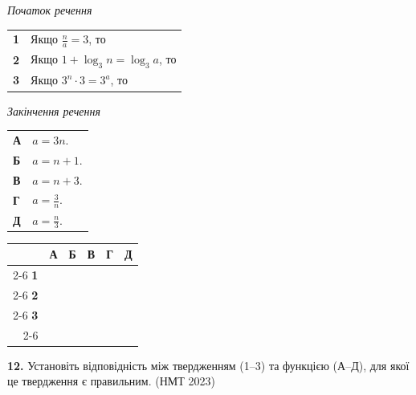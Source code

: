 \documentclass[14pt]{extarticle}
\newcommand{\answerGrid}{
    \begingroup
    \setlength{\tabcolsep}{4pt}
    \renewcommand{\arraystretch}{1.2}
    \small
    \begin{tabular}{r|c|c|c|c|c|}
         \multicolumn{1}{c}{} & \multicolumn{1}{c}{\textbf{А}} & \multicolumn{1}{c}{\textbf{Б}} & \multicolumn{1}{c}{\textbf{В}} & \multicolumn{1}{c}{\textbf{Г}} & \multicolumn{1}{c}{\textbf{Д}} \\ \cline{2-6}
         \textbf{1} & & & & & \\ \cline{2-6}
         \textbf{2} & & & & & \\ \cline{2-6}
         \textbf{3} & & & & & \\ \cline{2-6}
    \end{tabular}
    \endgroup
}
\newcommand{\nmtyear}[1]{\hfill{\small\color{yearcolor}(НМТ #1)}}
\begin{document}
\noindent
\begin{minipage}[t]{0.50\textwidth}
    \textit{Початок речення} \par \vspace{0.2cm}
    \begin{tabular}{@{}p{0.5cm} l@{}}
    \textbf{1} & Якщо $\displaystyle\frac{n}{a} = 3$, то \\[0.5cm]
    \textbf{2} & Якщо $1 + \log_3 n = \log_3 a$, то \\[0.4cm]
    \textbf{3} & \colorbox{yellow!30}{Якщо $3^n \cdot 3 = 3^a$, то} \\
    \end{tabular}
\end{minipage}%
\hfill
\begin{minipage}[t]{0.45\textwidth}
    \textit{Закінчення речення} \par \vspace{0.2cm}
    \begin{tabular}{@{}p{0.5cm} p{6cm}@{}}
    \textbf{А} & $a = 3n$. \\[0.2cm]
    \textbf{Б} & $a = n + 1$. \\[0.2cm]
    \textbf{В} & $a = n + 3$. \\[0.2cm]
    \textbf{Г} & $a = \displaystyle\frac{3}{n}$. \\[0.4cm]
    \textbf{Д} & $a = \displaystyle\frac{n}{3}$. \\
    \end{tabular}
\end{minipage}
\vspace{0.3cm}

\answerGrid
\vspace{0.7cm}

\noindent\textbf{12.} Установіть відповідність між твердженням (1–3) та функцією (А–Д), для якої це твердження є правильним. \nmtyear{2023}
\vspace{0.3cm}
\end{document}
